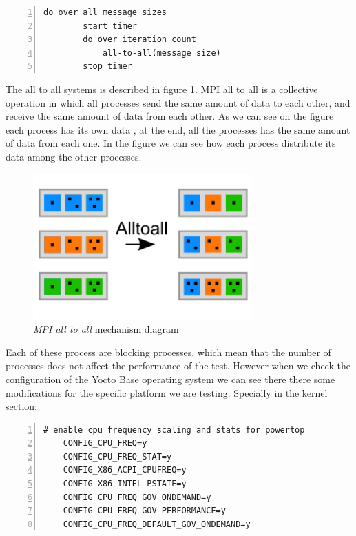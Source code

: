 \begin{lstlisting}[frame=single,numbers=left]
    do over all message sizes 
        start timer
        do over iteration count 
            all-to-all(message size)
        stop timer
\end{lstlisting}

The all to all systems is described in figure \ref{mpi_all_to_all_example}.
MPI all to all  is a collective operation in which all processes send the same
amount of data to each other, and receive the same amount of data from each
other. As we can see on the figure each process has its own data , at the end,
all the processes has the same amount of data from each one. In the figure we
can see how each process distribute its data among the other processes.

\begin{figure}[H]
\centering
\includegraphics[width=0.75\textwidth]{images/mpi_all_to_all.png}
\caption{\textit{MPI all to all} mechanism diagram}
\label{mpi_all_to_all_example}
\end{figure}

Each of these process are blocking processes, which mean that the number of
processes does not affect the performance of the test. However when we check
the configuration of the Yocto Base operating system we can see there there
some modifications for the specific platform we are testing. Specially in the
kernel section: 

\begin{lstlisting}[frame=single,numbers=left]
    # enable cpu frequency scaling and stats for powertop
    CONFIG_CPU_FREQ=y
    CONFIG_CPU_FREQ_STAT=y
    CONFIG_X86_ACPI_CPUFREQ=y
    CONFIG_X86_INTEL_PSTATE=y
    CONFIG_CPU_FREQ_GOV_ONDEMAND=y
    CONFIG_CPU_FREQ_GOV_PERFORMANCE=y
    CONFIG_CPU_FREQ_DEFAULT_GOV_ONDEMAND=y
\end{lstlisting}

